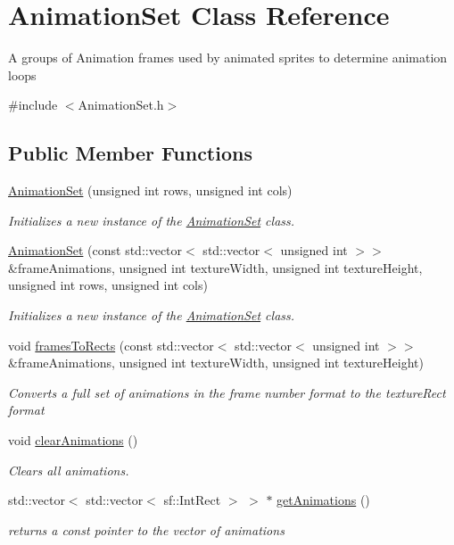 \hypertarget{class_animation_set}{}\section{Animation\+Set Class Reference}
\label{class_animation_set}


A groups of Animation frames used by animated sprites to determine animation loops 




{\ttfamily \#include $<$Animation\+Set.\+h$>$}

\subsection*{Public Member Functions}
\begin{DoxyCompactItemize}
\item 
\hyperlink{class_animation_set_a4291450987a71b6923ecdc44d38f3647}{Animation\+Set} (unsigned int rows, unsigned int cols)
\begin{DoxyCompactList}\small\item\em Initializes a new instance of the \hyperlink{class_animation_set}{Animation\+Set} class. \end{DoxyCompactList}\item 
\hyperlink{class_animation_set_a1a7cce6f8664911363d621ec01f022e6}{Animation\+Set} (const std\+::vector$<$ std\+::vector$<$ unsigned int $>$$>$ \&frame\+Animations, unsigned int texture\+Width, unsigned int texture\+Height, unsigned int rows, unsigned int cols)
\begin{DoxyCompactList}\small\item\em Initializes a new instance of the \hyperlink{class_animation_set}{Animation\+Set} class. \end{DoxyCompactList}\item 
void \hyperlink{class_animation_set_ab673697a6a87e0d62cc9d8da5912e633}{frames\+To\+Rects} (const std\+::vector$<$ std\+::vector$<$ unsigned int $>$$>$ \&frame\+Animations, unsigned int texture\+Width, unsigned int texture\+Height)
\begin{DoxyCompactList}\small\item\em Converts a full set of animations in the frame number format to the texture\+Rect format \end{DoxyCompactList}\item 
void \hyperlink{class_animation_set_a6c48243cd06f90f7b21c792f7f092a83}{clear\+Animations} ()
\begin{DoxyCompactList}\small\item\em Clears all animations. \end{DoxyCompactList}\item 
std\+::vector$<$ std\+::vector$<$ sf\+::\+Int\+Rect $>$ $>$ $\ast$ \hyperlink{class_animation_set_ae523b9c1f7702b1ebe02662078a8f701}{get\+Animations} ()
\begin{DoxyCompactList}\small\item\em returns a const pointer to the vector of animations \end{DoxyCompactList}\end{DoxyCompactItemize}
